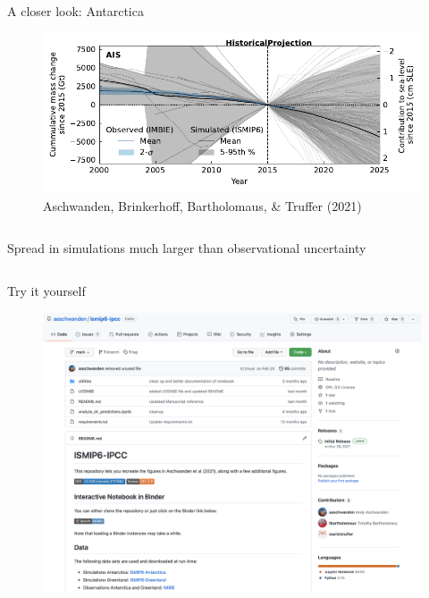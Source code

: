 \documentclass[hide notes,intlimits]{beamer}
\begin{document}
\begin{frame}{A closer look: Antarctica}
  \begin{figure}
    \includegraphics[width=\textwidth]{AIS_historical}
    \caption{Aschwanden, Brinkerhoff, Bartholomaus, \& Truffer (2021)}
  \end{figure}
  \begin{columns}[c]
    \begin{column}{.5\textwidth}
      \begin{minipage}[t][.5\textheight][t]{\textwidth}
        \alert{Spread in simulations much larger than observational uncertainty}
      \end{minipage}
    \end{column}
    \begin{column}{.25\textwidth}
    \end{column}
  \end{columns}
\end{frame}


\begin{frame}{Try it yourself}
  \begin{figure}
    \includegraphics[width=.85\textwidth]{ismip6-ipcc-github-repo}
  \end{figure}
\end{frame}
\end{document}

